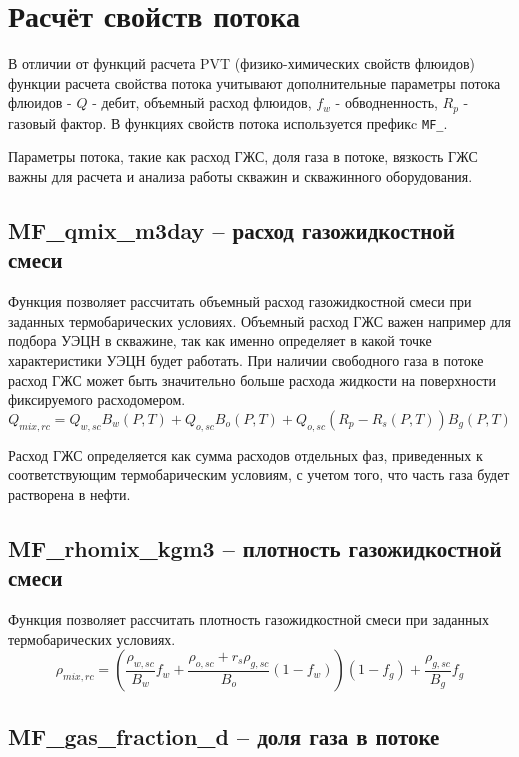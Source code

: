 \section{Расчёт свойств потока}

В отличии от функций расчета PVT (физико-химических свойств флюидов) функции расчета свойства потока учитывают дополнительные параметры потока флюидов - $Q$ - дебит, объемный расход флюидов, $f_w$ - обводненность, $R_p$ - газовый фактор. В функциях свойств потока используется префикc \texttt{MF_}.

Параметры потока, такие как расход ГЖС, доля газа в потоке, вязкость ГЖС важны для расчета и анализа работы скважин и скважинного оборудования.


\subsection{MF\_qmix\_m3day – расход газожидкостной смеси}

Функция позволяет рассчитать объемный расход газожидкостной смеси при заданных термобарических условиях. Объемный расход ГЖС важен например для подбора УЭЦН в скважине, так как именно определяет в какой точке характеристики УЭЦН будет работать. При наличии свободного газа в потоке расход ГЖС может быть значительно больше расхода жидкости на поверхности фиксируемого расходомером.
$$Q_{mix,rc} = Q_{w,sc} B_w(P,T) + Q_{o,sc} B_o(P,T)  + Q_{o,sc}  (R_p - R_s(P,T)) B_g(P,T) $$

Расход ГЖС определяется как сумма расходов отдельных фаз, приведенных к соответствующим термобарическим условиям, с учетом того, что часть газа будет растворена в нефти.


\subsection{MF\_rhomix\_kgm3 – плотность газожидкостной смеси}

Функция позволяет рассчитать плотность газожидкостной смеси при заданных термобарических условиях. 
$$\rho_{mix,rc} = \left( \frac{\rho_{w,sc}}{B_w} f_w + \frac{\rho_{o,sc} +r_s \rho_{g,sc} }{B_o}(1-f_w) \right) (1-f_g) + \frac{ \rho_{g,sc} }{B_g} f_g $$


\subsection{MF\_gas\_fraction\_d – доля газа в потоке}

